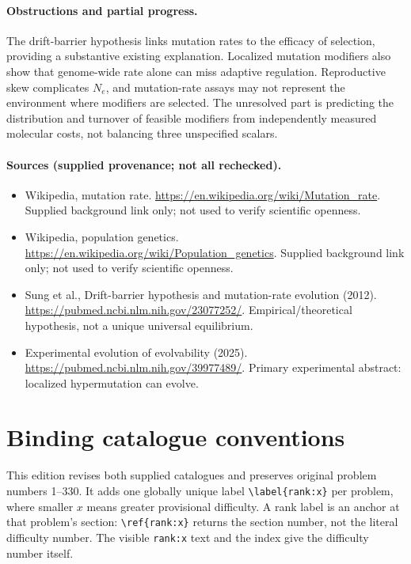 \documentclass[11pt]{article}
\begin{document}
\paragraph{Obstructions and partial progress.} The drift-barrier hypothesis links mutation rates to the efficacy of selection, providing a substantive existing explanation. Localized mutation modifiers also show that genome-wide rate alone can miss adaptive regulation. Reproductive skew complicates $N_e$, and mutation-rate assays may not represent the environment where modifiers are selected. The unresolved part is predicting the distribution and turnover of feasible modifiers from independently measured molecular costs, not balancing three unspecified scalars.
\paragraph{Sources (supplied provenance; not all rechecked).}
\begin{itemize}
\item Wikipedia, mutation rate. \url{https://en.wikipedia.org/wiki/Mutation_rate}. Supplied background link only; not used to verify scientific openness.
\item Wikipedia, population genetics. \url{https://en.wikipedia.org/wiki/Population_genetics}. Supplied background link only; not used to verify scientific openness.
\item Sung et al., Drift-barrier hypothesis and mutation-rate evolution (2012). \url{https://pubmed.ncbi.nlm.nih.gov/23077252/}. Empirical/theoretical hypothesis, not a unique universal equilibrium.
\item Experimental evolution of evolvability (2025). \url{https://pubmed.ncbi.nlm.nih.gov/39977489/}. Primary experimental abstract: localized hypermutation can evolve.
\end{itemize}


\section*{Binding catalogue conventions}
This edition revises both supplied catalogues and preserves original problem numbers 1--330. It adds one globally unique label \verb|\label{rank:x}| per problem, where smaller $x$ means greater provisional difficulty. A rank label is an anchor at that problem's section: \verb|\ref{rank:x}| returns the section number, not the literal difficulty number. The visible \texttt{rank:x} text and the index give the difficulty number itself.
\end{document}
